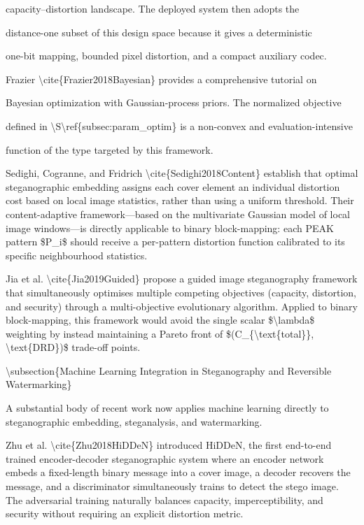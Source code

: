 \documentclass[a4paper,fleqn]{cas-dc}
\newenvironment{RevisionDeletion}{%
  \par\begingroup\color{revisionred}\footnotesize\ttfamily
  \setlength{\parindent}{0pt}\setlength{\parskip}{1pt}\obeyspaces
}{\par\endgroup}
\begin{document}
\begin{RevisionDeletion}
capacity--distortion landscape. The deployed system then adopts the\par
distance-one subset of this design space because it gives a deterministic\par
one-bit mapping, bounded pixel distortion, and a compact auxiliary codec.\par
\par
Frazier \textbackslash{}cite\{Frazier2018Bayesian\} provides a comprehensive tutorial on\par
Bayesian optimization with Gaussian-process priors. The normalized objective\par
defined in \textbackslash{}S\textbackslash{}ref\{subsec:param\_optim\} is a non-convex and evaluation-intensive\par
function of the type targeted by this framework.\par
\par
Sedighi, Cogranne, and Fridrich \textbackslash{}cite\{Sedighi2018Content\} establish that optimal steganographic embedding assigns each cover element an individual distortion cost based on local image statistics, rather than using a uniform threshold. Their content-adaptive framework---based on the multivariate Gaussian model of local image windows---is directly applicable to binary block-mapping: each PEAK pattern \$P\_i\$ should receive a per-pattern distortion function calibrated to its specific neighbourhood statistics.\par
\par
Jia et al. \textbackslash{}cite\{Jia2019Guided\} propose a guided image steganography framework that simultaneously optimises multiple competing objectives (capacity, distortion, and security) through a multi-objective evolutionary algorithm. Applied to binary block-mapping, this framework would avoid the single scalar \$\textbackslash{}lambda\$ weighting by instead maintaining a Pareto front of \$(C\_\{\textbackslash{}text\{total\}\}, \textbackslash{}text\{DRD\})\$ trade-off points.\par
\par
\textbackslash{}subsection\{Machine Learning Integration in Steganography and Reversible Watermarking\}\par
\par
A substantial body of recent work now applies machine learning directly to steganographic embedding, steganalysis, and watermarking.\par
\par
Zhu et al. \textbackslash{}cite\{Zhu2018HiDDeN\} introduced HiDDeN, the first end-to-end trained encoder-decoder steganographic system where an encoder network embeds a fixed-length binary message into a cover image, a decoder recovers the message, and a discriminator simultaneously trains to detect the stego image. The adversarial training naturally balances capacity, imperceptibility, and security without requiring an explicit distortion metric.\par

\end{RevisionDeletion}
\end{document}
